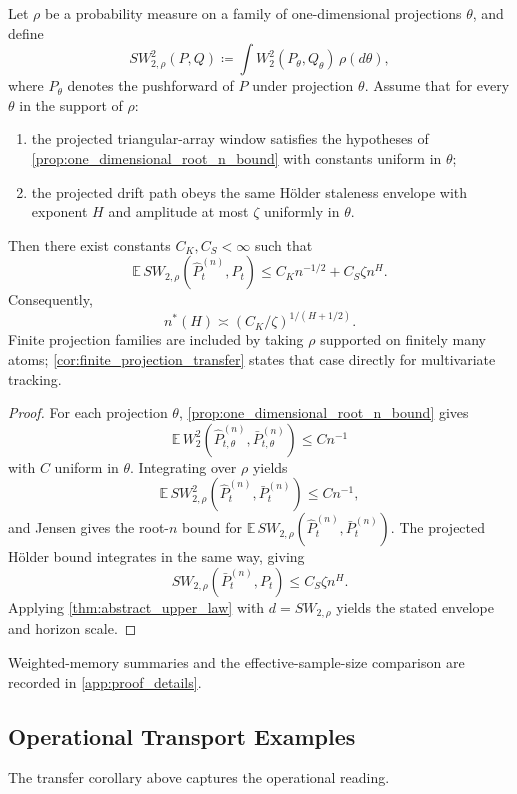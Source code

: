 \begin{corollary}
\label{cor:sliced_wasserstein_transfer}
Let $\rho$ be a probability measure on a family of one-dimensional projections
$\theta$, and define
\[
  SW_{2,\rho}^2(P,Q)
  \coloneqq \int W_2^2(P_{\theta},Q_{\theta})\,\rho(d\theta),
\]
where $P_{\theta}$ denotes the pushforward of $P$ under projection $\theta$.
Assume that for every $\theta$ in the support of $\rho$:
\begin{enumerate}[label=(\roman*)]
  \item the projected triangular-array window satisfies the hypotheses of
  \cref{prop:one_dimensional_root_n_bound} with constants uniform in $\theta$;
  \item the projected drift path obeys the same H\"older staleness envelope with
  exponent $H$ and amplitude at most $\zeta$ uniformly in $\theta$.
\end{enumerate}
Then there exist constants $C_K,C_S<\infty$ such that
\[
  \mathbb E\,SW_{2,\rho}\!\left(\widehat P_t^{(n)},P_t\right)
  \le C_K n^{-1/2} + C_S\zeta n^H.
\]
Consequently,
\[
  n^*(H)\asymp (C_K/\zeta)^{1/(H+1/2)}.
\]
Finite projection families are included by taking $\rho$ supported on finitely
many atoms; \cref{cor:finite_projection_transfer} states that case directly for
multivariate tracking.
\end{corollary}

\begin{proof}
For each projection $\theta$, \cref{prop:one_dimensional_root_n_bound} gives
\[
  \mathbb E\,W_2^2\!\left(\widehat P_{t,\theta}^{(n)},\bar P_{t,\theta}^{(n)}\right)
  \le C n^{-1}
\]
with $C$ uniform in $\theta$. Integrating over $\rho$ yields
\[
  \mathbb E\,SW_{2,\rho}^2\!\left(\widehat P_t^{(n)},\bar P_t^{(n)}\right)
  \le C n^{-1},
\]
and Jensen gives the root-$n$ bound for
$\mathbb E\,SW_{2,\rho}(\widehat P_t^{(n)},\bar P_t^{(n)})$. The projected
H\"older bound integrates in the same way, giving
\[
  SW_{2,\rho}\!\left(\bar P_t^{(n)},P_t\right)\le C_S\zeta n^H.
\]
Applying \cref{thm:abstract_upper_law} with $d=SW_{2,\rho}$ yields the stated
envelope and horizon scale.
\end{proof}

Weighted-memory summaries and the effective-sample-size comparison are recorded
in \cref{app:proof_details}.

\subsection{Operational Transport Examples}

The transfer corollary above captures the operational reading.
